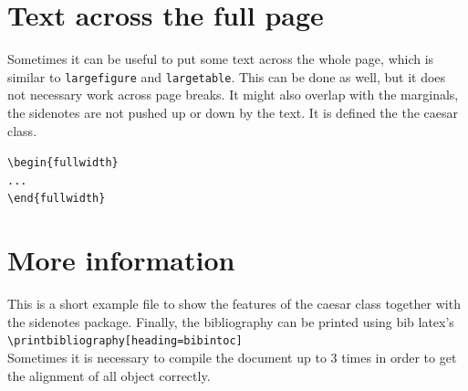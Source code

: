 \documentclass{caesar_book}
\begin{document}
\section{Text across the full page}
\begin{fullwidth}
Sometimes it can be useful to put some text across the whole page, which is similar to \texttt{largefigure} and \texttt{largetable}. This can be done as well, but it does not necessary work across page breaks. It might also overlap with the marginals, the sidenotes are not pushed up or down by the text. It is defined the the caesar class.
\end{fullwidth}
\verb+\begin{fullwidth}+\\
\verb+...+\\
\verb+\end{fullwidth}+\\
%
\section{More information}
This is a short example file to show the features of the caesar class together with the sidenotes package. Finally, the bibliography can be printed using bib latex's\\
\verb+\printbibliography[heading=bibintoc]+\\
Sometimes it is necessary to compile the document up to 3 times in order to get the alignment of all object correctly.
%
\printbibliography[heading=bibintoc]
\end{document}
